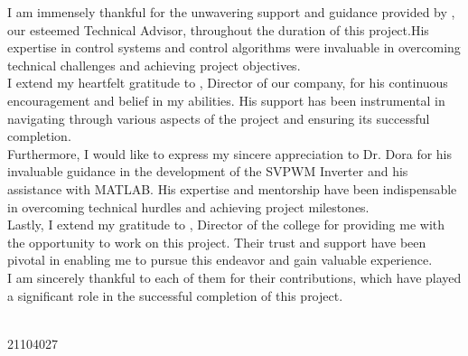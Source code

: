 I am immensely thankful for the unwavering support and guidance provided by
\industry, our esteemed Technical Advisor, throughout the duration of this
project.His expertise in control systems and control algorithms were invaluable
in overcoming technical challenges and achieving project objectives.\\

I extend my heartfelt gratitude to \director, Director of our company, for his
continuous encouragement and belief in my abilities. His support has been
instrumental in navigating through various aspects of the project and ensuring
its successful completion.\\

Furthermore, I would like to express my sincere appreciation to Dr. Dora for his
invaluable guidance in the development of the SVPWM Inverter and his assistance
with MATLAB. His expertise and mentorship have been indispensable in overcoming
technical hurdles and achieving project milestones.\\

Lastly, I extend my gratitude to \directorcollege, Director of the college for
providing me with the opportunity to work on this project. Their trust and
support have been pivotal in enabling me to pursue this endeavor and gain
valuable experience.\\

I am sincerely thankful to each of them for their contributions, which have
played a significant role in the successful completion of this project.

\vfill
\begin{minipage}[t]{1\textwidth}
    \raggedleft
    \name \\ 21104027
\end{minipage}